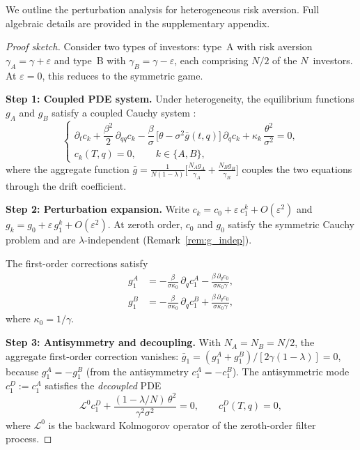 \documentclass[12pt]{article}
\theoremstyle{remark}
\theoremstyle{definition}
\begin{document}
We outline the perturbation analysis for heterogeneous risk aversion.
Full algebraic details are provided in the supplementary appendix.

\begin{proof}[Proof sketch]
Consider two types of investors: type~A with risk aversion
$\gamma_A = \gamma + \varepsilon$ and type~B with
$\gamma_B = \gamma - \varepsilon$, each comprising $N/2$ of the
$N$~investors.
At $\varepsilon = 0$, this reduces to the symmetric game.

\medskip\noindent\textbf{Step 1: Coupled PDE system.}
Under heterogeneity, the equilibrium functions $g_A$ and $g_B$ satisfy
a coupled Cauchy system
\citep[Theorems~3.1 and 3.2, Remark~3.4]{HuangSun2025}:
\begin{equation}\label{eq:coupled_PDE}
\begin{cases}
  \partial_t c_k + \dfrac{\beta^2}{2}\,\partial_{qq} c_k
  - \dfrac{\beta}{\sigma}\,
    \bigl[\theta - \sigma^2\bar{g}(t,q)\bigr]\,\partial_q c_k
  + \kappa_k\,\dfrac{\theta^2}{\sigma^2} = 0, \\[6pt]
  c_k(T,q) = 0, \qquad k \in \{A, B\},
\end{cases}
\end{equation}
where the aggregate function
$\bar{g} = \frac{1}{N(1-\lambda)}\bigl[\frac{N_A g_A}{\gamma_A}
+ \frac{N_B g_B}{\gamma_B}\bigr]$
couples the two equations through the drift coefficient.

\medskip\noindent\textbf{Step 2: Perturbation expansion.}
Write $c_k = c_0 + \varepsilon\,c_1^k + O(\varepsilon^2)$ and
$g_k = g_0 + \varepsilon\,g_1^k + O(\varepsilon^2)$.
At zeroth order, $c_0$ and $g_0$ satisfy the symmetric Cauchy problem
and are $\lambda$-independent (Remark~\ref{rem:g_indep}).

The first-order corrections satisfy
\begin{align}
  g_1^A &= -\frac{\beta}{\sigma\kappa_0}\,\partial_q c_1^A
          - \frac{\beta\,\partial_q c_0}{\sigma\kappa_0\gamma},
  \label{eq:g1A} \\
  g_1^B &= -\frac{\beta}{\sigma\kappa_0}\,\partial_q c_1^B
          + \frac{\beta\,\partial_q c_0}{\sigma\kappa_0\gamma},
  \label{eq:g1B}
\end{align}
where $\kappa_0 = 1/\gamma$.

\medskip\noindent\textbf{Step 3: Antisymmetry and decoupling.}
With $N_A = N_B = N/2$, the aggregate first-order correction vanishes:
$\bar{g}_1 = (g_1^A + g_1^B)/[2\gamma(1-\lambda)] = 0$, because
$g_1^A = -g_1^B$ (from the antisymmetry $c_1^A = -c_1^B$).
The antisymmetric mode $c_1^D := c_1^A$ satisfies the \emph{decoupled} PDE
\begin{equation}\label{eq:c1D_PDE}
  \mathcal{L}^0 c_1^D + \frac{(1-\lambda/N)\,\theta^2}{\gamma^2\sigma^2} = 0,
  \qquad c_1^D(T,q) = 0,
\end{equation}
where $\mathcal{L}^0$ is the backward Kolmogorov operator of the
zeroth-order filter process.


\end{proof}
\end{document}
